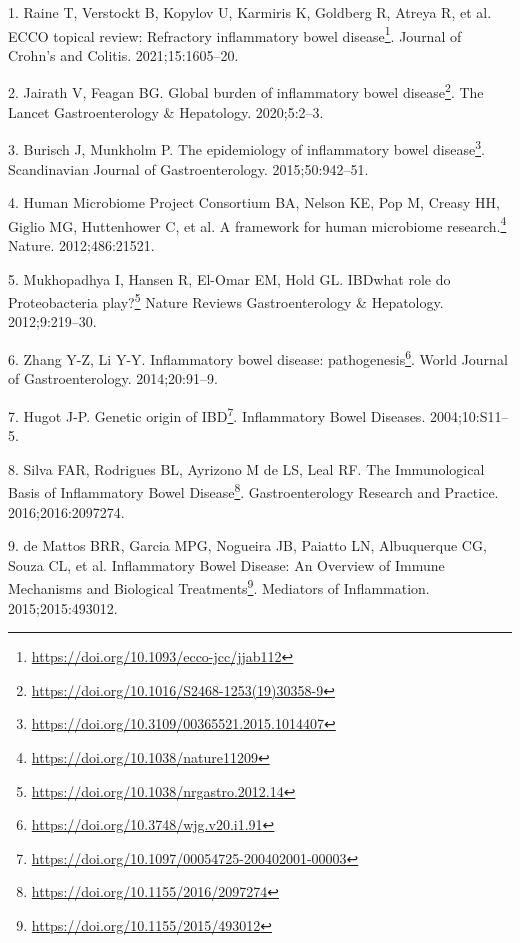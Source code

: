 \documentclass[
  12pt,
  a4paper,
  twoside,
  openright]{book}
\DeclareRobustCommand{\href}[2]{#2\footnote{\url{#1}}}
\newlength{\cslhangindent}
\newlength{\cslentryspacingunit} %
\newenvironment{CSLReferences}[2] %
 {%
  \setlength{\parindent}{0pt}
  \ifodd #1
  \let\oldpar\par
  \def\par{\hangindent=\cslhangindent\oldpar}
  \fi
  \setlength{\parskip}{#2\cslentryspacingunit}
 }%
 {}
\begin{document}
\begin{CSLReferences}{0}{0}
\leavevmode{}%
1. Raine T, Verstockt B, Kopylov U, Karmiris K, Goldberg R, Atreya R, et al. \href{https://doi.org/10.1093/ecco-jcc/jjab112}{ECCO topical review: Refractory inflammatory bowel disease}. Journal of Crohn's and Colitis. 2021;15:1605--20.

\leavevmode{}%
2. Jairath V, Feagan BG. \href{https://doi.org/10.1016/S2468-1253(19)30358-9}{Global burden of inflammatory bowel disease}. The Lancet Gastroenterology \& Hepatology. 2020;5:2--3.

\leavevmode{}%
3. Burisch J, Munkholm P. \href{https://doi.org/10.3109/00365521.2015.1014407}{The epidemiology of inflammatory bowel disease}. Scandinavian Journal of Gastroenterology. 2015;50:942--51.

\leavevmode{}%
4. Human Microbiome Project Consortium BA, Nelson KE, Pop M, Creasy HH, Giglio MG, Huttenhower C, et al. \href{https://doi.org/10.1038/nature11209}{A framework for human microbiome research.} Nature. 2012;486:21521.

\leavevmode{}%
5. Mukhopadhya I, Hansen R, El-Omar EM, Hold GL. \href{https://doi.org/10.1038/nrgastro.2012.14}{IBD{\textemdash}what role do Proteobacteria play?} Nature Reviews Gastroenterology \& Hepatology. 2012;9:219--30.

\leavevmode{}%
6. Zhang Y-Z, Li Y-Y. \href{https://doi.org/10.3748/wjg.v20.i1.91}{Inflammatory bowel disease: pathogenesis}. World Journal of Gastroenterology. 2014;20:91--9.

\leavevmode{}%
7. Hugot J-P. \href{https://doi.org/10.1097/00054725-200402001-00003}{Genetic origin of IBD}. Inflammatory Bowel Diseases. 2004;10:S11--5.

\leavevmode{}%
8. Silva FAR, Rodrigues BL, Ayrizono M de LS, Leal RF. \href{https://doi.org/10.1155/2016/2097274}{The Immunological Basis of Inflammatory Bowel Disease}. Gastroenterology Research and Practice. 2016;2016:2097274.

\leavevmode{}%
9. de Mattos BRR, Garcia MPG, Nogueira JB, Paiatto LN, Albuquerque CG, Souza CL, et al. \href{https://doi.org/10.1155/2015/493012}{Inflammatory Bowel Disease: An Overview of Immune Mechanisms and Biological Treatments}. Mediators of Inflammation. 2015;2015:493012.


\end{CSLReferences}
\end{document}
